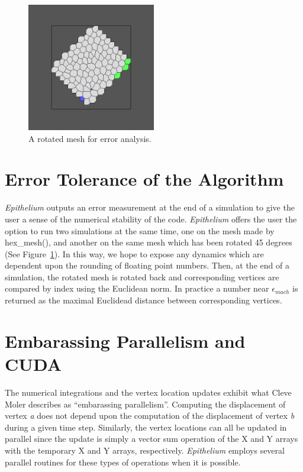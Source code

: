 \begin{figure}[hr]
\centering
\includegraphics[width=0.5\textwidth]{../diagrams/rotate.png}
\caption{A rotated mesh for error analysis.}
\label{fig:rotate}
\end{figure}

\section{Error Tolerance of the Algorithm}
\emph{Epithelium} outputs an error measurement at the end of a simulation to give the user a sense of the numerical stability of the code. \emph{Epithelium} offers the user the option to run two simulations at the same time, one on the mesh made by hex\_mesh(), and another on the same mesh which has been rotated 45 degrees (See Figure~\ref{fig:rotate}). In this way, we hope to expose any dynamics which are dependent upon the rounding of floating point numbers. Then, at the end of a simulation, the rotated mesh is rotated back and corresponding vertices are compared by index using the Euclidean norm. In practice a number near $\epsilon_{mach}$ is returned as the maximal Euclidead distance between corresponding vertices.

\section{Embarassing Parallelism and CUDA}
The numerical integrations and the vertex location updates exhibit what Cleve Moler describes as ``embarassing parallelism''. Computing the displacement of vertex \emph{a} does not depend upon the computation of the displacement of vertex \emph{b} during a given time step. Similarly, the vertex locations can all be updated in parallel since the update is simply a vector sum operation of the X and Y arrays with the temporary X and Y arrays, respectively. \emph{Epithelium} employs several parallel routines for these types of operations when it is possible. 

